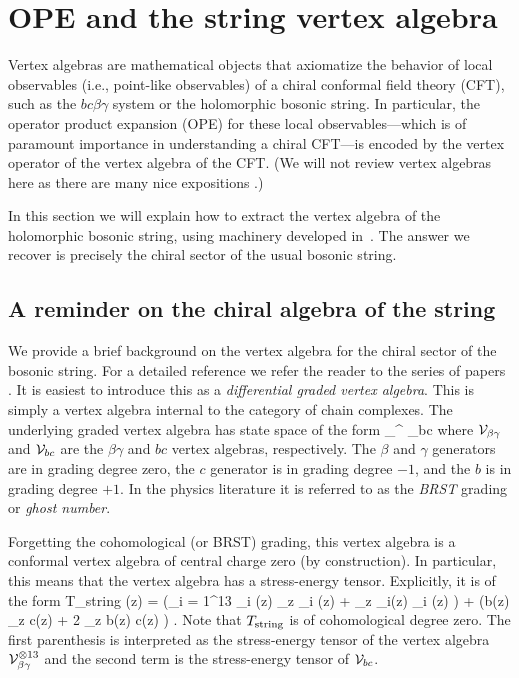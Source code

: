 \section{OPE and the string vertex algebra}


Vertex algebras are mathematical objects that axiomatize the behavior of local observables 
(i.e., point-like observables) of a chiral conformal field theory (CFT),
such as the $bc\beta\gamma$ system or the holomorphic bosonic string.
In particular, the operator product expansion (OPE) for these local observables---which is of paramount importance in understanding a chiral CFT---is encoded by the vertex operator of the vertex algebra of the CFT.
(We will not review vertex algebras here
as there are many nice expositions \cite{FHL, BZF}.)

In this section we will explain how to extract the vertex algebra of the holomorphic bosonic string,
using machinery developed in~\cite{CG1,LiVA,GGW}.
The answer we recover is precisely the chiral sector of the usual bosonic string.

\subsection{A reminder on the chiral algebra of the string}\label{subsec: string vert}

We provide a brief background on the vertex algebra for the chiral sector of the bosonic string. 
For a detailed reference we refer the reader to the series of papers \cite{LZ1,LZ2}. 
It is easiest to introduce this as a {\em differential graded vertex algebra}. 
This is simply a vertex algebra internal to the category of chain complexes. 
The underlying graded vertex algebra has state space of the form
\ben
\cV_{\beta \gamma}^{} \tensor \cV_{bc}
\een
where $\mathcal{V}_{\beta\gamma}$ and $\mathcal{V}_{bc}$ are the $\beta\gamma$ and $bc$ vertex algebras, respectively. 
The $\beta$ and $\gamma$ generators are in grading degree zero, the $c$ generator is in grading degree $-1$, and the $b$ is in grading degree $+1$. 
In the physics literature it is referred to as the {\em BRST} grading or {\em ghost number}.

Forgetting the cohomological (or BRST) grading, this vertex algebra is a conformal vertex algebra of central charge zero (by construction). 
In particular, this means that the vertex algebra has a stress-energy tensor. 
Explicitly, it is of the form
\ben
T_{\rm string} (z) = \left(\sum_{i = 1}^{13} \beta_i (z) \partial_z \gamma_i (z) + \partial_z \beta_i(z) \gamma_i (z) \right) + \left(b(z) \partial_z c(z) + 2 \partial_z b(z) c(z) \right) . 
\een
Note that $T_{\rm string}$ is of cohomological degree zero. 
The first parenthesis is interpreted as the stress-energy tensor of the vertex algebra $\mathcal{V}_{\beta \gamma}^{\otimes 13}$ and the second term is the stress-energy tensor of $\mathcal{V}_{bc}$. 


